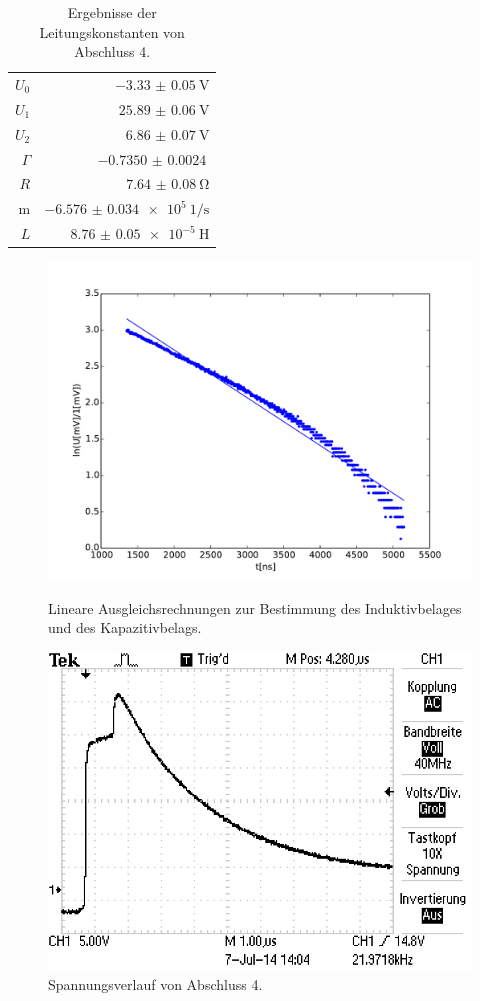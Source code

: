 \begin{table}
\centering
	\caption[]{Ergebnisse der Leitungskonstanten von Abschluss 4.}
	\begin{tabular}{r|r}
		\hline\hline
		$U_0$    & $\SI{-3.33(5)}{\volt}$\\
		$U_1$    & $\SI{25.89(6)}{\volt}$\\
		$U_2$    & $\SI{6.86(7)}{\volt}$\\
		$\Gamma$ & $\SI{-0.7350(24)}{}$\\
		$R$    & $\SI{7.64(8)}{\ohm}$\\
		m      & $\SI{-6.576(34)e5}{1\per\second}$\\
		$L$    & $\SI{8.76(5)e-5}{\henry}$\\
	\end{tabular}
\end{table}

\begin{figure}
	\centering
	\includegraphics[width = 14cm]{data/d/Regression2.pdf}
	\caption{Lineare Ausgleichsrechnungen zur Bestimmung des Induktivbelages und des Kapazitivbelags.}
	\includegraphics[width = 12cm]{data/d/F0005TEK.JPG}
	\caption{Spannungsverlauf von Abschluss 4.}
	\label{fig_abs4}
\end{figure}
\FloatBarrier
